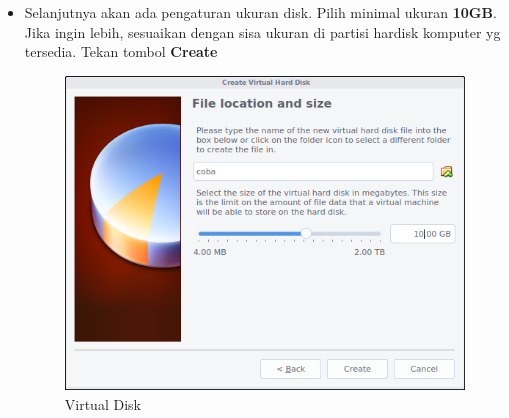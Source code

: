 \documentclass[12pt,]{article}
\begin{document}
\begin{itemize}
		\item Selanjutnya akan ada pengaturan ukuran disk.
		Pilih minimal ukuran \textbf{10GB}. Jika ingin lebih, sesuaikan dengan sisa ukuran di partisi hardisk komputer yg tersedia.
		Tekan tombol \textbf{Create}
		\begin{figure}[H]
			\centering
			\includegraphics[width=0.6\linewidth]{images/vbox_installinux/s2}
			\caption{Virtual Disk}
		\end{figure}
	\end{itemize}
\end{document}
